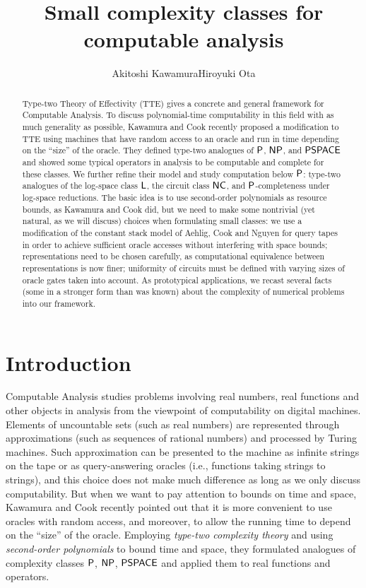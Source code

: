 \documentclass[envcountsame,orivec,oribibl]{llncs}
\title{Small complexity classes for computable analysis}
\author{Akitoshi Kawamura\qquad\qquad Hiroyuki Ota}
\institute{University of Tokyo}
\begin{document}
\maketitle

\begin{abstract}
Type-two Theory of Effectivity (TTE) gives a concrete and general framework for 
Computable Analysis. 
To discuss polynomial-time computability 
in this field with as much generality as possible, 
Kawamura and Cook recently proposed a modification to TTE using 
machines that have random access to an oracle and 
run in time depending on the ``size'' of the oracle. 
They defined type-two analogues of 
$\mathsf{P}$, $\mathsf{NP}$, and $\mathsf{PSPACE}$ 
and showed some typical operators in analysis
to be computable and complete for these classes. 
We further refine their model and study computation below $\mathsf{P}$: 
type-two analogues of 
the log-space class $\mathsf{L}$, 
the circuit class $\mathsf{NC}$, 
and $\mathsf{P}$-completeness under log-space reductions.
The basic idea is 
to use second-order polynomials as resource bounds, 
as Kawamura and Cook did, 
but we need to make some nontrivial (yet natural, as we will discuss) choices
when formulating small classes: 
we use a modification of the constant stack model 
of Aehlig, Cook and Nguyen for query tapes 
in order to achieve 
sufficient oracle accesses without interfering with space bounds; 
representations need to be chosen carefully, as 
computational equivalence between representations is now finer; 
uniformity of circuits must be defined 
with varying sizes of oracle gates taken into account. 
As prototypical applications, 
we recast several facts (some in a stronger form than was known) 
about the complexity of numerical problems 
into our framework. 
\end{abstract}

\section{Introduction}

Computable Analysis 
\cite{ko1991complexity,weihrauch00:_comput_analy}
studies problems 
involving real numbers, real functions and other objects in analysis
from the viewpoint of computability on digital machines. 
Elements of uncountable sets (such as real numbers) are
represented through approximations (such as sequences of rational numbers)
and processed by Turing machines. 
Such approximation can be 
presented to the machine 
as infinite strings on the tape 
or as query-answering oracles (i.e., functions taking strings to strings), 
and this choice does not make much difference 
as long as we only discuss computability. 
But when we want to pay attention to bounds on time and space, 
Kawamura and Cook \cite{kawamura2012complexity} recently pointed out that 
it is more convenient to use oracles with random access, 
and moreover, to allow the running time 
to depend on the ``size'' of the oracle. 
Employing \emph{type-two complexity theory} and 
using \emph{second-order polynomials} to bound time and space, 
they formulated analogues of complexity classes 
$\mathsf{P}$, $\mathsf{NP}$, $\mathsf{PSPACE}$ and 
applied them to real functions and operators. 
\end{document}
